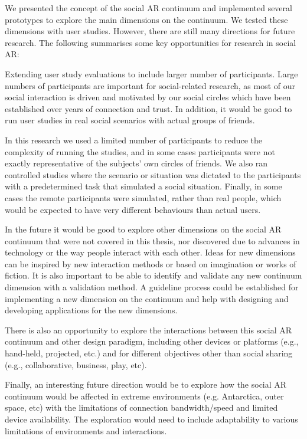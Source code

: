 We presented the concept of the social AR continuum and implemented several prototypes to explore the main dimensions on the continuum. We tested these dimensions with user studies. However, there are still many directions for future research. The following summarises some key opportunities for research in social AR:  

Extending user study evaluations to include larger number of participants. Large numbers of participants are important for social-related research, as most of our social interaction is driven and motivated by our social circles which have been established over years of connection and trust.  In addition, it would be good to run user studies in real social scenarios with actual groups of friends.

In this research we used a limited number of participants to reduce the complexity of running the studies, and in some cases participants were not exactly representative of the subjects' own circles of friends. We also ran controlled studies where the scenario or situation was dictated to the participants with a predetermined task that simulated a social situation. Finally, in some cases the remote participants were simulated, rather than real people, which would be expected to have very different behaviours than actual users.

In the future it would be good to explore other dimensions on the social AR continuum that were not covered in this thesis, nor discovered due to advances in technology or the way people interact with each other. Ideas for new dimensions can be inspired by new interaction methods or based on imagination or works of fiction. It is also important to be able to identify and validate any new continuum dimension with a validation method. A guideline process could be established for implementing a new dimension on the continuum and help with designing and developing applications for the new dimensions. 

There is also an opportunity to explore the interactions between this social AR continuum and other design paradigm, including other devices or platforms (e.g., hand-held, projected, etc.) and for different objectives other than social sharing (e.g., collaborative, business, play, etc).

Finally, an interesting future direction would be to explore how the social AR continuum would be affected in extreme environments (e.g. Antarctica, outer space, etc) with the limitations of connection bandwidth/speed and limited device availability. The exploration would need to include adaptability to various limitations of environments and interactions. 

